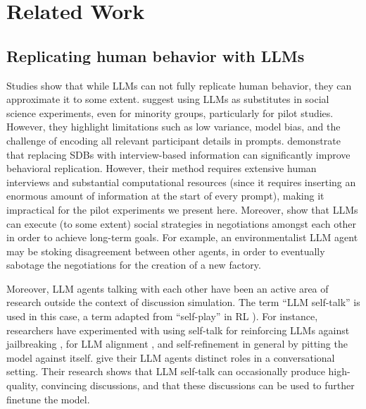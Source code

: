 %

\section{Related Work}


\subsection{Replicating human behavior with LLMs}

Studies show that while \acp{LLM} can not fully replicate human behavior, they can approximate it to some extent. \citet{hewitt2024predicting} suggest using \acp{LLM} as substitutes in social science experiments, even for minority groups, particularly for pilot studies. However, they highlight limitations such as low variance, model bias, and the challenge of encoding all relevant participant details in prompts. \citet{park2024generativeagentsimulations1000} demonstrate that replacing \acp{SDB} with interview-based information can significantly improve behavioral replication. However, their method requires extensive human interviews and substantial computational resources (since it requires inserting an enormous amount of information at the start of every prompt), making it impractical for the pilot experiments we present here. Moreover, \citet{abdelnabi2024cooperationcompetitionmaliciousnessllmstakeholders} show that \acp{LLM} can execute (to some extent) social strategies in negotiations amongst each other in order to achieve long-term goals. For example, an environmentalist \ac{LLM} agent may be stoking disagreement between other agents, in order to eventually sabotage the negotiations for the creation of a new factory.

Moreover, \ac{LLM} agents talking with each other have been an active area of research outside the context of discussion simulation. The term “\ac{LLM} self-talk” is used in this case, a term adapted from “self-play” in \ac{RL} \citep{cheng2024selfplayingadversariallanguagegame}). For instance, researchers have experimented with using self-talk for reinforcing \acp{LLM} against jailbreaking \cite{liu2024largelanguagemodelsagents, cheng2024selfplayingadversariallanguagegame, zheng2024optimalllmalignmentsusing}, for \ac{LLM} alignment \cite{Bai2022ConstitutionalAH, collective_constitution}, and self-refinement in general \cite{Madaan2023SelfRefineIR, lambert2024selfdirectedsyntheticdialoguesrevisions} by pitting the model against itself. \citet{ulmer2024bootstrappingllmbasedtaskorienteddialogue} give their \ac{LLM} agents distinct roles in a conversational setting. Their research shows that \ac{LLM} self-talk can occasionally produce high-quality, convincing discussions, and that these discussions can be used to further finetune the model.  


